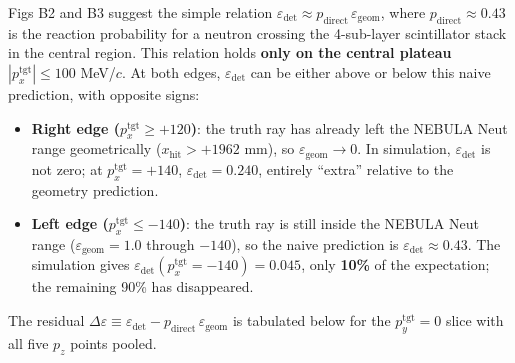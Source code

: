 \documentclass[a4paper,11pt]{article}
\begin{document}
Figs B2 and B3 suggest the simple relation
$\varepsilon_\mathrm{det} \approx p_\mathrm{direct}\,\varepsilon_\mathrm{geom}$,
where $p_\mathrm{direct}\approx 0.43$ is the reaction probability for a neutron
crossing the 4-sub-layer scintillator stack in the central region. This relation
holds \textbf{only on the central plateau} $|p_x^\mathrm{tgt}| \leq 100$
MeV/$c$. At both edges, $\varepsilon_\mathrm{det}$ can be either above or below
this naive prediction, with opposite signs:
\begin{itemize}
    \item \textbf{Right edge ($p_x^\mathrm{tgt}\geq +120$)}: the truth ray has
          already left the NEBULA Neut range geometrically
          ($x_\mathrm{hit}>+1962$ mm), so
          $\varepsilon_\mathrm{geom}\to 0$. In simulation,
          $\varepsilon_\mathrm{det}$ is not zero; at
          $p_x^\mathrm{tgt}=+140$, $\varepsilon_\mathrm{det}=0.240$, entirely
          ``extra'' relative to the geometry prediction.
    \item \textbf{Left edge ($p_x^\mathrm{tgt}\leq -140$)}: the truth ray is
          still inside the NEBULA Neut range
          ($\varepsilon_\mathrm{geom}=1.0$ through $-140$), so the naive
          prediction is $\varepsilon_\mathrm{det}\approx 0.43$. The simulation
          gives $\varepsilon_\mathrm{det}(p_x^\mathrm{tgt}=-140)=0.045$, only
          \textbf{10\%} of the expectation; the remaining 90\% has disappeared.
\end{itemize}

The residual
$\Delta\varepsilon \equiv
\varepsilon_\mathrm{det}-p_\mathrm{direct}\,\varepsilon_\mathrm{geom}$
is tabulated below for the $p_y^\mathrm{tgt}=0$ slice with all five $p_z$ points
pooled.
\end{document}
